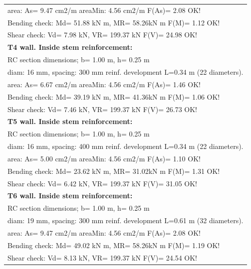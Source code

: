 \begin{center}
\begin{supertabular}[H]{|l|}
  area: As=   9.47 cm2/m areaMin:   4.56 cm2/m  F(As)= 2.08 OK!\\
  Bending check: Md=  51.88 kN m, MR=  58.26kN m  F(M)= 1.12 OK!\\
  Shear check: Vd=   7.98 kN,  VR= 199.37 kN  F(V)= 24.98 OK!\\
\hline
\textbf{T4 wall. Inside stem reinforcement:}\\
  RC section dimensions; b= 1.00 m, h= 0.25 m\\
  diam: 16 mm, spacing: 300 mm  reinf. development L=0.34 m (22 diameters).\\
  area: As=   6.67 cm2/m areaMin:   4.56 cm2/m  F(As)= 1.46 OK!\\
  Bending check: Md=  39.19 kN m, MR=  41.36kN m  F(M)= 1.06 OK!\\
  Shear check: Vd=   7.46 kN,  VR= 199.37 kN  F(V)= 26.73 OK!\\
\hline
\textbf{T5 wall. Inside stem reinforcement:}\\
  RC section dimensions; b= 1.00 m, h= 0.25 m\\
  diam: 16 mm, spacing: 400 mm  reinf. development L=0.34 m (22 diameters).\\
  area: As=   5.00 cm2/m areaMin:   4.56 cm2/m  F(As)= 1.10 OK!\\
  Bending check: Md=  23.62 kN m, MR=  31.02kN m  F(M)= 1.31 OK!\\
  Shear check: Vd=   6.42 kN,  VR= 199.37 kN  F(V)= 31.05 OK!\\
\hline
\textbf{T6 wall. Inside stem reinforcement:}\\
  RC section dimensions; b= 1.00 m, h= 0.25 m\\
  diam: 19 mm, spacing: 300 mm  reinf. development L=0.61 m (32 diameters).\\
  area: As=   9.47 cm2/m areaMin:   4.56 cm2/m  F(As)= 2.08 OK!\\
  Bending check: Md=  49.02 kN m, MR=  58.26kN m  F(M)= 1.19 OK!\\
  Shear check: Vd=   8.13 kN,  VR= 199.37 kN  F(V)= 24.54 OK!\\
\end{supertabular}
\end{center}

